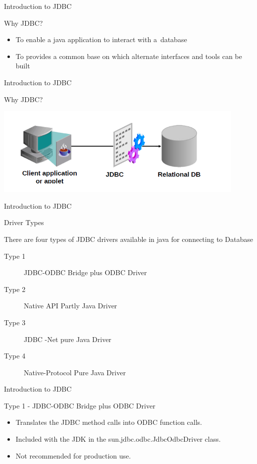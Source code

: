 \documentclass[14pt]{beamer}
\begin{document}
\begin{frame}{Introduction to JDBC}
\begin{block}{}
Why JDBC?
\end{block}

\begin{itemize}
\item To enable a java application to interact with a database
\item To provides a common base on which alternate interfaces and tools can be built
\end{itemize}
\end{frame}

\begin{frame}{Introduction to JDBC}
\begin{block}{}
Why JDBC?
\end{block}

\begin{center}
    \includegraphics[scale=0.5]{JEE-M03-S01-Image1.png}
  \end{center}
\end{frame}

\begin{frame}{Introduction to JDBC}
\begin{block}{}
Driver Types
\end{block}
There are four types of  JDBC drivers available in java for connecting to Database
\begin{description}
\item [Type 1] JDBC-ODBC Bridge plus ODBC Driver
\item [Type 2] Native API Partly Java Driver
\item [Type 3] JDBC -Net pure Java Driver
\item [Type 4] Native-Protocol Pure Java Driver
\end{description}
\end{frame}

\begin{frame}{Introduction to JDBC}
\begin{block}{}
  Type 1 - JDBC-ODBC Bridge plus ODBC Driver
\end{block}
\begin{itemize}
\item Translates the JDBC method calls into ODBC function calls.
\item Included with the JDK in the sun.jdbc.odbc.JdbcOdbcDriver class.
\item Not recommended for production use.
\end{itemize}
\end{frame}
\end{document}
